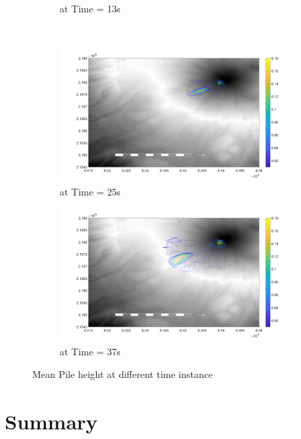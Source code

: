 \begin{figure}[H]
\begin{subfigure}{0.46\textwidth}
\caption{at Time = 13s} 
\end{subfigure} \\
\begin{subfigure}{0.46\textwidth}
\centering
\includegraphics[width=\textwidth]{dem_figs/fig25}
\caption{at Time = 25s}
\end{subfigure}
\begin{subfigure}{0.46\textwidth}
\centering
\includegraphics[width=\textwidth]{dem_figs/fig37}
\caption{at Time = 37s}
\end{subfigure}
\caption{Mean Pile height at different time instance}
\label{fig:colima_error}
\end{figure}

\section{Summary}

